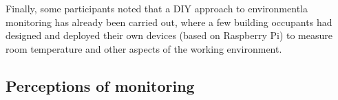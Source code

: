Finally, some participants noted that a DIY approach to environmentla
monitoring has already been carried out, where a few building
occupants had designed and deployed
their own devices (based on Raspberry Pi) to measure room temperature and
other aspects of the working environment. 

\subsection{Perceptions of monitoring}
\label{sec:perc-monit}





